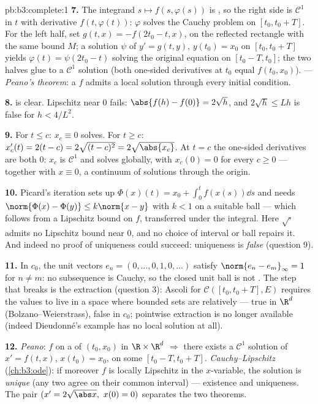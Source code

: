 \begin{solution}{pb:b3:complete:1}
\textbf{7.} The integrand $s \mapsto f(s, \varphi(s))$ is
, so the right side is $\mathcal C^1$ in $t$ with
derivative $f(t, \varphi(t))$: $\varphi$ solves the Cauchy
problem on $[t_0, t_0 + T]$. For the left half, set $g(t, x) =
-f(2t_0 - t, x)$,  on the reflected rectangle with
the same bound $M$; a solution $\psi$ of $y' = g(t,y)$,
$y(t_0) = x_0$ on $[t_0, t_0 + T]$ yields $\varphi(t) =
\psi(2t_0 - t)$ solving the original equation on $[t_0 - T,
t_0]$; the two halves glue to a $\mathcal C^1$ solution (both
one-sided derivatives at $t_0$ equal $f(t_0, x_0)$). ---
\emph{Peano's theorem}: a  $f$ admits a local
solution through every initial condition.

\textbf{8.}  is clear. Lipschitz near $0$ fails:
$\abs{f(h) - f(0)} = 2\sqrt h$, and $2\sqrt h \leq L h$ is
false for $h < 4/L^2$.

\textbf{9.} For $t \leq c$: $x_c \equiv 0$ solves. For $t \geq
c$: $x_c'(t) = 2(t - c) = 2\sqrt{(t-c)^2} = 2\sqrt{\abs{x_c}}$.
At $t = c$ the one-sided derivatives are both $0$: $x_c$ is
$\mathcal C^1$ and solves globally, with $x_c(0) = 0$ for every
$c \geq 0$ --- together with $x \equiv 0$, a continuum of
solutions through the origin.

\textbf{10.} Picard's iteration sets up $\Phi(x)(t) = x_0 +
\int_0^t f(x(s))\dd s$ and needs $\norm{\Phi(x) - \Phi(y)}
\leq k\norm{x - y}$ with $k < 1$ on a suitable ball --- which
follows from a Lipschitz bound on $f$, transferred under the
integral. Here $\sqrt\cdot$ admits no Lipschitz bound near $0$,
and no choice of interval or ball repairs it. And indeed no
proof of uniqueness could succeed: uniqueness is \emph{false}
(question 9).

\textbf{11.} In $c_0$, the unit vectors $e_n = (0, \dots, 0, 1,
0, \dots)$ satisfy $\norm{e_n - e_m}_\infty = 1$ for $n \neq
m$: no subsequence is Cauchy, so the closed unit ball is not
. The step that breaks is the extraction (question 3):
Ascoli for $\mathcal C([t_0, t_0+T], E)$ requires the values to
live in a space where bounded sets are relatively  ---
true in $\R^d$ (Bolzano--Weierstrass), false in $c_0$; pointwise
extraction is no longer available (indeed Dieudonn\'e's example
has no local solution at all).

\textbf{12.} \emph{Peano}: $f$  on a  of
$(t_0, x_0)$ in $\R\times\R^d$ $\Rightarrow$ there exists a
$\mathcal C^1$ solution of $x' = f(t,x)$, $x(t_0) = x_0$, on
some $[t_0 - T, t_0 + T]$. \emph{Cauchy--Lipschitz}
(\cref{ch:b3:ode}): if moreover $f$ is locally Lipschitz in the
$x$-variable, the solution is \emph{unique} (any two agree on
their common interval) --- existence and uniqueness. The pair
$(x' = 2\sqrt{\abs x},\ x(0) = 0)$ separates the two theorems.


\end{solution}
